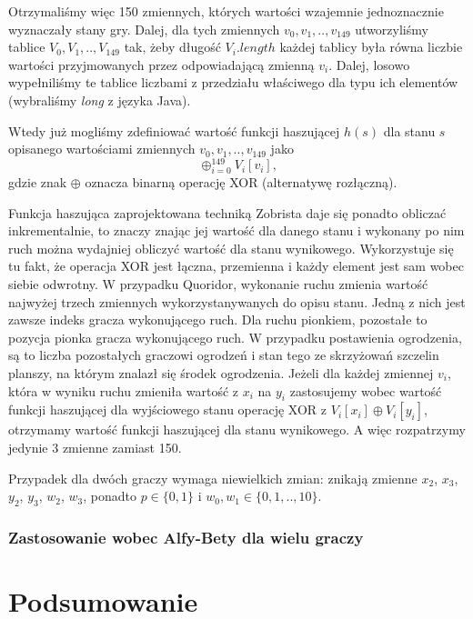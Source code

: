 \documentclass{pracamgr}
\begin{document}
Otrzymaliśmy więc 150 zmiennych, których wartości wzajemnie jednoznacznie wyznaczały stany gry.
Dalej, dla tych zmiennych \(v_0, v_1, .., v_{149}\) utworzyliśmy tablice \(V_0, V_1, .., V_{149}\) tak, żeby długość \(V_i.length\) każdej tablicy była równa liczbie wartości przyjmowanych przez odpowiadającą zmienną \(v_i\).
Dalej, losowo wypełniliśmy te tablice liczbami z przedziału właściwego dla typu ich elementów (wybraliśmy \emph{long} z języka Java).

Wtedy już mogliśmy zdefiniować wartość funkcji haszującej \(h(s)\) dla stanu \(s\) opisanego wartościami zmiennych \(v_0, v_1, .., v_{149}\) jako \[\oplus_{i = 0}^{149} V_i[v_i]\text{,}\] gdzie znak \(\oplus\) oznacza binarną operację XOR (alternatywę rozłączną).

Funkcja haszująca zaprojektowana techniką Zobrista daje się ponadto obliczać inkrementalnie, to znaczy znając jej wartość dla danego stanu i wykonany po nim ruch można wydajniej obliczyć wartość dla stanu wynikowego.
Wykorzystuje się tu fakt, że operacja XOR jest łączna, przemienna i każdy element jest sam wobec siebie odwrotny.
W przypadku Quoridor, wykonanie ruchu zmienia wartość najwyżej trzech zmiennych wykorzystanywanych do opisu stanu.
Jedną z nich jest zawsze indeks gracza wykonującego ruch.
Dla ruchu pionkiem, pozostałe to pozycja pionka gracza wykonującego ruch.
W przypadku postawienia ogrodzenia, są to liczba pozostałych graczowi ogrodzeń i stan tego ze skrzyżowań szczelin planszy, na którym znalazł się środek ogrodzenia.
Jeżeli dla każdej zmiennej \(v_i\), która w wyniku ruchu zmieniła wartość z \(x_i\) na \(y_i\) zastosujemy wobec wartość funkcji haszującej dla wyjściowego stanu operację XOR z \(V_i[x_i] \oplus V_i[y_i]\), otrzymamy wartość funkcji haszującej dla stanu wynikowego.
A więc rozpatrzymy jedynie 3 zmienne zamiast 150.

Przypadek dla dwóch graczy wymaga niewielkich zmian: znikają zmienne \(x_2\), \(x_3\), \(y_2\), \(y_3\), \(w_2\), \(w_3\), ponadto \(p \in \{0, 1\}\) i \(w_0, w_1 \in \{0, 1, .., 10\}\).

\subsection{Zastosowanie wobec Alfy-Bety dla wielu graczy}

\chapter{Podsumowanie}
\end{document}
